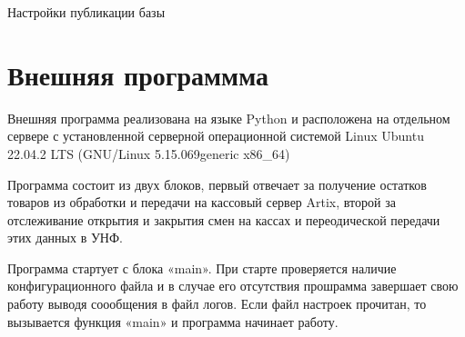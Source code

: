 \documentclass[letterpaper,10pt,russian]{sphinxmanual}
\begin{document}
\sphinxAtStartPar
Настройки публикации базы

\begin{figure}[htbp]
\centering

\noindent{}
\end{figure}

\sphinxstepscope


\chapter{Внешняя программма}
\label{\detokenize{prox:id1}}\label{\detokenize{prox::doc}}
\sphinxAtStartPar
Внешняя программа реализована на языке Python и расположена на отдельном сервере с установленной серверной операционной системой Linux
Ubuntu 22.04.2 LTS (GNU/Linux 5.15.0\sphinxhyphen{}69\sphinxhyphen{}generic x86\_64)

\sphinxAtStartPar
Программа состоит из двух блоков, первый отвечает за получение остатков товаров из обработки и передачи на кассовый сервер Artix,
второй за отслеживание открытия и закрытия смен на кассах и переодической передачи этих данных в УНФ.

\sphinxAtStartPar
{}
\begin{quote}

\sphinxAtStartPar
{}
\end{quote}

\sphinxAtStartPar
Программа стартует с блока «main». При старте проверяется наличие конфигурационного файла  и
в случае его отсутствия прошрамма завершает свою работу выводя соообщения в файл логов. Если
файл настроек прочитан, то вызывается функция «main» и программа начинает работу.

\begin{sphinxVerbatim}[commandchars=\\\{\}]
  
   
    
\end{sphinxVerbatim}
\end{document}
